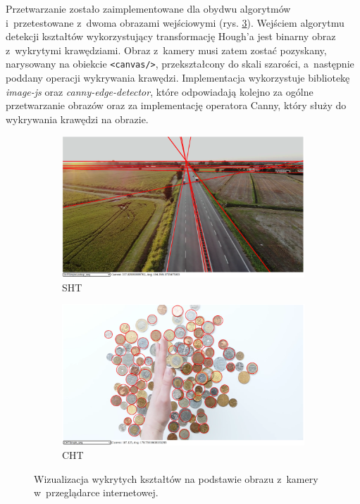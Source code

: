 Przetwarzanie zostało zaimplementowane dla obydwu algorytmów i~przetestowane z~dwoma obrazami wejściowymi (rys. \ref{fig:road-money}). Wejściem algorytmu detekcji kształtów wykorzystujący transformację Hough'a jest binarny obraz z~wykrytymi krawędziami. Obraz z~kamery musi zatem zostać pozyskany, narysowany na obiekcie \lstinline{<canvas/>}, przekształcony do skali szarości, a~następnie poddany operacji wykrywania krawędzi. Implementacja wykorzystuje bibliotekę \textit{image-js}\cite{image-js} oraz \textit{canny-edge-detector}\cite{canny}, które odpowiadają kolejno za ogólne przetwarzanie obrazów oraz za implementację operatora Canny, który służy do wykrywania krawędzi na obrazie. 

\begin{figure}
    \centering
    \begin{subfigure}{0.48\textwidth}
        \centering
        \includegraphics[width=\linewidth]{img/road.png}
        \caption{SHT}\label{fig:road}
    \end{subfigure}\hfill
    \begin{subfigure}{0.48\textwidth}
        \centering
        \includegraphics[width=\linewidth]{img/money.png}
        \caption{CHT}\label{fig:money}
    \end{subfigure}
    \caption{Wizualizacja wykrytych kształtów na podstawie obrazu z~kamery w~przeglądarce internetowej.}
    \label{fig:road-money}
\end{figure}

